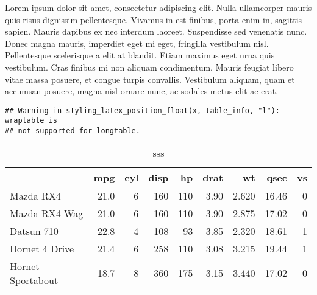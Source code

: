 \documentclass[]{article}
\newenvironment{Shaded}{\begin{snugshade}}{\end{snugshade}}
\newcommand{\KeywordTok}[1]{\textcolor[rgb]{0.13,0.29,0.53}{\textbf{{#1}}}}
\newcommand{\DataTypeTok}[1]{\textcolor[rgb]{0.13,0.29,0.53}{{#1}}}
\newcommand{\DecValTok}[1]{\textcolor[rgb]{0.00,0.00,0.81}{{#1}}}
\newcommand{\StringTok}[1]{\textcolor[rgb]{0.31,0.60,0.02}{{#1}}}
\newcommand{\NormalTok}[1]{{#1}}
\begin{document}
\endgroup

Lorem ipsum dolor sit amet, consectetur adipiscing elit. Nulla
ullamcorper mauris quis risus dignissim pellentesque. Vivamus in est
finibus, porta enim in, sagittis sapien. Mauris dapibus ex nec interdum
laoreet. Suspendisse sed venenatis nunc. Donec magna mauris, imperdiet
eget mi eget, fringilla vestibulum nisl. Pellentesque scelerisque a elit
at blandit. Etiam maximus eget urna quis vestibulum. Cras finibus mi non
aliquam condimentum. Mauris feugiat libero vitae massa posuere, et
congue turpis convallis. Vestibulum aliquam, quam et accumsan posuere,
magna nisl ornare nunc, ac sodales metus elit ac erat.

\begin{Shaded}
\end{Shaded}

\begin{verbatim}
## Warning in styling_latex_position_float(x, table_info, "l"): wraptable is
## not supported for longtable.
\end{verbatim}

\begingroup\fontsize{6}{8}\selectfont
{}

\begin{longtable}[l]{l|r|r|r|r|r|r|r|r}
\caption{\label{tab:unnamed-chunk-8}sss}\\
\hline
  & mpg & cyl & disp & hp & drat & wt & qsec & vs\\
\hline
Mazda RX4 & 21.0 & 6 & 160 & 110 & 3.90 & 2.620 & 16.46 & 0\\
\hline
Mazda RX4 Wag & 21.0 & 6 & 160 & 110 & 3.90 & 2.875 & 17.02 & 0\\
\hline
Datsun 710 & 22.8 & 4 & 108 & 93 & 3.85 & 2.320 & 18.61 & 1\\
\hline
Hornet 4 Drive & 21.4 & 6 & 258 & 110 & 3.08 & 3.215 & 19.44 & 1\\
\hline
Hornet Sportabout & 18.7 & 8 & 360 & 175 & 3.15 & 3.440 & 17.02 & 0\\
\hline
\end{longtable}

\endgroup
\end{document}
